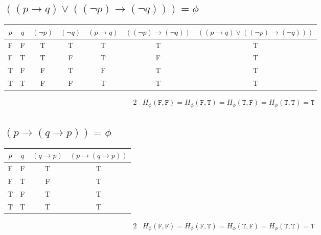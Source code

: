 \documentclass{article}
\begin{document}
\subsection{$((p \to q) \vee ((\lnot p) \to (\lnot q))) = \phi$}
\begin{center}
    \begin{NiceTabular}{|c|c|c|c|c|c|c|}
        \hline
        $p$ & $q$ & $(\lnot p)$ & $(\lnot q)$ & $(p \to q)$ & $((\lnot p) \to (\lnot q))$ & $((p \to q) \vee ((\lnot p) \to (\lnot q)))$\\
        \hline
        \ttfamily F & \ttfamily F & \ttfamily T & \ttfamily T & \ttfamily T & \ttfamily T & \ttfamily T\\
        \ttfamily F & \ttfamily T & \ttfamily T & \ttfamily F & \ttfamily T & \ttfamily F & \ttfamily T\\
        \ttfamily T & \ttfamily F & \ttfamily F & \ttfamily T & \ttfamily F & \ttfamily T & \ttfamily T\\
        \ttfamily T & \ttfamily T & \ttfamily F & \ttfamily F & \ttfamily T & \ttfamily T & \ttfamily T\\
        \hline
    \end{NiceTabular}
\end{center}
\begin{alignat*}{2}
    & H_{\phi}(\mathtt{F}, \mathtt{F}) = H_{\phi}(\mathtt{F}, \mathtt{T}) = H_{\phi}(\mathtt{T}, \mathtt{F}) = H_{\phi}(\mathtt{T}, \mathtt{T}) = \mathtt{T}
\end{alignat*}
\subsection{$(p \to (q \to p)) = \phi$}
\begin{center}
    \begin{NiceTabular}{|c|c|c|c|}
        \hline
        $p$ & $q$ & $(q \to p)$ & $(p \to (q \to p))$\\
        \hline
        \ttfamily F & \ttfamily F & \ttfamily T & \ttfamily T\\
        \ttfamily F & \ttfamily T & \ttfamily F & \ttfamily T\\
        \ttfamily T & \ttfamily F & \ttfamily T & \ttfamily T\\
        \ttfamily T & \ttfamily T & \ttfamily T & \ttfamily T\\
        \hline
    \end{NiceTabular}
\end{center}
\begin{alignat*}{2}
    & H_{\phi}(\mathtt{F}, \mathtt{F}) = H_{\phi}(\mathtt{F}, \mathtt{T}) = H_{\phi}(\mathtt{T}, \mathtt{F}) = H_{\phi}(\mathtt{T}, \mathtt{T}) = \mathtt{T}
\end{alignat*}
\end{document}
